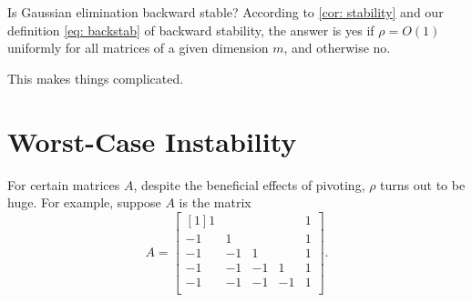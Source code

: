 \begin{note}
Is Gaussian elimination backward stable? According to \autoref{cor: stability} and our definition \eqref{eq: backstab} of backward stability, the answer is yes if $\rho = O(1)$ uniformly for all matrices of a given dimension $m$, and otherwise no.

This makes things complicated. 
\end{note}



\section{Worst-Case Instability}
For certain matrices $A$, despite the beneficial effects of pivoting, $\rho$ turns out to be huge. For example, suppose $A$ is the matrix 
\begin{equation}
\label{eq: bad case for GE}
A = \begin{bmatrix}[1] 
    1 &  &  &  &  1 \\
    -1 & 1 &  &  &  1 \\
    -1 & -1 & 1 &  &  1 \\
    -1 & -1 & -1 & 1 &  1 \\
    -1 & -1 & -1 & -1 &  1 \\
\end{bmatrix}.     
\end{equation}

